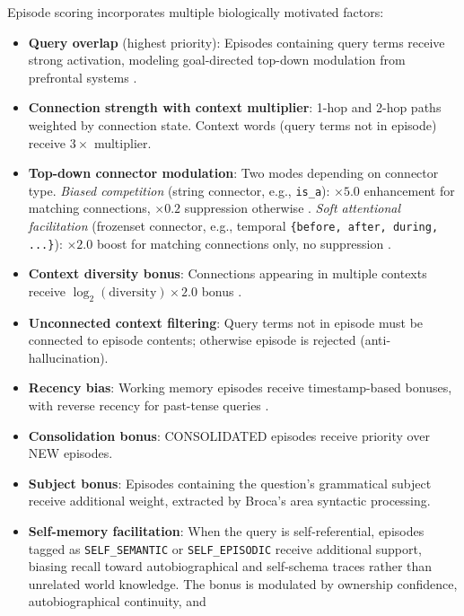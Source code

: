 \documentclass[11pt]{article}
\begin{document}
Episode scoring incorporates multiple biologically motivated factors:

\begin{itemize}
\item \textbf{Query overlap} (highest priority): Episodes containing query terms
      receive strong activation, modeling goal-directed top-down modulation from prefrontal systems
      \citep{miller2001integrative,zanto2011causal,desimone1995neural}.
\item \textbf{Connection strength with context multiplier}: 1-hop and 2-hop paths weighted
      by connection state. Context words (query terms not in episode) receive $3\times$ multiplier.
\item \textbf{Top-down connector modulation}: Two modes depending on connector type.
      \emph{Biased competition} (string connector, e.g., \texttt{is\_a}): $\times 5.0$
      enhancement for matching connections, $\times 0.2$ suppression otherwise
      \citep{desimone1995neural}. \emph{Soft attentional facilitation} (frozenset connector,
      e.g., temporal \texttt{\{before, after, during, ...\}}): $\times 2.0$ boost for
      matching connections only, no suppression \citep{miller2001integrative}.
\item \textbf{Context diversity bonus}: Connections appearing in multiple contexts receive
      $\log_2(\text{diversity}) \times 2.0$ bonus \citep{spens2024generative}.
\item \textbf{Unconnected context filtering}: Query terms not in episode must be connected
      to episode contents; otherwise episode is rejected (anti-hallucination).
\item \textbf{Recency bias}: Working memory episodes receive timestamp-based bonuses,
      with reverse recency for past-tense queries \citep{howard2002distributed}.
\item \textbf{Consolidation bonus}: CONSOLIDATED episodes receive priority over NEW episodes.
\item \textbf{Subject bonus}: Episodes containing the question's grammatical subject
      receive additional weight, extracted by Broca's area syntactic processing.
\item \textbf{Self-memory facilitation}: When the query is self-referential, episodes tagged
      as \texttt{SELF\_SEMANTIC} or \texttt{SELF\_EPISODIC} receive additional support, biasing
      recall toward autobiographical and self-schema traces rather than unrelated world knowledge.
      The bonus is modulated by ownership confidence, autobiographical continuity, and

\end{itemize}
\end{document}
